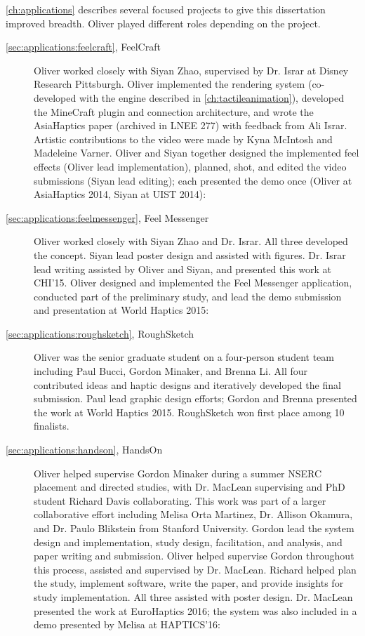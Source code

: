 \noindent
\autoref{ch:applications} describes several focused projects to give this dissertation improved breadth.
Oliver played different roles depending on the project.
\begin{description}

\item[\autoref{sec:applications:feelcraft}, FeelCraft] Oliver worked closely with Siyan Zhao, supervised by Dr. Israr at Disney Research Pittsburgh.
Oliver implemented the rendering system (co-developed with the engine described in \autoref{ch:tactileanimation}), developed the MineCraft plugin and connection architecture, and wrote the AsiaHaptics paper (archived in LNEE 277) with feedback from Ali Israr.
Artistic contributions to the video were made by Kyna McIntosh and Madeleine Varner.
Oliver and Siyan together designed the implemented feel effects (Oliver lead implementation), planned, shot, and edited the video submissions (Siyan lead editing); each presented the demo once (Oliver at AsiaHaptics 2014, Siyan at UIST 2014):



\item[\autoref{sec:applications:feelmessenger}, Feel Messenger] Oliver worked closely with Siyan Zhao and Dr. Israr.
All three developed the concept.
Siyan lead poster design and assisted with figures.
Dr. Israr lead writing assisted by Oliver and Siyan, and presented this work at CHI'15.
Oliver designed and implemented the Feel Messenger application, conducted part of the preliminary study, and lead the demo submission and presentation at World Haptics 2015:


\item[\autoref{sec:applications:roughsketch}, RoughSketch] Oliver was the senior graduate student on a four-person student team including Paul Bucci, Gordon Minaker, and Brenna Li.
All four contributed ideas and haptic designs and iteratively developed the final submission.
Paul lead graphic design efforts; Gordon and Brenna presented the work at World Haptics 2015.
RoughSketch won first place among 10 finalists.

\item[\autoref{sec:applications:handson}, HandsOn] Oliver helped supervise Gordon Minaker during a summer NSERC placement and directed studies, with Dr. MacLean supervising and PhD student Richard Davis collaborating.
This work was part of a larger collaborative effort including Melisa Orta Martinez, Dr. Allison Okamura, and Dr. Paulo Blikstein from Stanford University.
Gordon lead the system design and implementation, study design, facilitation, and analysis, and paper writing and submission.
Oliver helped supervise Gordon throughout this process, assisted and supervised by Dr. MacLean.
Richard helped plan the study, implement software, write the paper, and provide insights for study implementation.
All three assisted with poster design.
 Dr. MacLean presented the work at EuroHaptics 2016; the system was also included in a demo presented by Melisa at HAPTICS'16:


\end{description}
